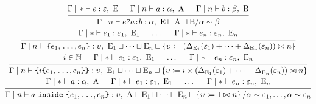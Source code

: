 \documentclass{article}
\newcommand{\A}{\mathrm{A}}
\newcommand{\B}{\mathrm{B}}
\newcommand{\E}{\mathrm{E}}
\renewcommand{\epsilon}{\varepsilon}
\begin{document}
\begin{spreadlines}{2em}
    \begin{gather*}
        \begin{prooftree}
            \hypo{\Gamma \mid \ast \vdash e: \epsilon,~\E}
            \hypo{\Gamma \mid n \vdash a: \alpha,~\A}
            \hypo{\Gamma \mid n \vdash b: \beta,~\B}
            \infer3{\Gamma \mid n \vdash e \texttt{?} a \texttt{:} b: \alpha,~\E \sqcup \A \sqcup \B / \alpha \sim \beta}
        \end{prooftree}
        \\
        \begin{prooftree}
            \hypo{\Gamma \mid \ast \vdash e_1: \epsilon_1,~\E_1}
            \hypo{\dots}
            \hypo{\Gamma \mid \ast \vdash e_n: \epsilon_n,~\E_n}
            \infer3{\Gamma \mid n \vdash \texttt{\{}e_1, \texttt{\dots}, e_n \texttt{\}} : \upsilon,~\E_1 \sqcup \cdots \sqcup \E_n\sqcup\left\{\upsilon \coloneq \left(\Delta_{\E_1}(\epsilon_1) + \cdots + \Delta_{\E_n}(\epsilon_n)\right)\bowtie n\right\}}
        \end{prooftree}
        \\
        \begin{prooftree}
            \hypo{i \in \mathbb{N}}
            \hypo{\Gamma \mid \ast \vdash e_1: \epsilon_1,~\E_1}
            \hypo{\dots}
            \hypo{\Gamma \mid \ast \vdash e_n: \epsilon_n,~\E_n}
            \infer4{\Gamma \mid n \vdash \texttt{\{}i\texttt{\{}e_1, \texttt{\dots}, e_n \texttt{\}}\texttt{\}} : \upsilon,~\E_1 \sqcup \cdots \sqcup \E_n \sqcup \left\{\upsilon \coloneq i\times\left(\Delta_{\E_1}(\epsilon_1) + \cdots + \Delta_{\E_n}(\epsilon_n)\right) \bowtie n\right\}}
        \end{prooftree}
        \\
        \begin{prooftree}
            \hypo{\Gamma \mid \ast \vdash a: \alpha,~\A}
            \hypo{\Gamma \mid \ast \vdash e_1: \epsilon_1,~\E_1}
            \hypo{\dots}
            \hypo{\Gamma \mid \ast \vdash e_n: \epsilon_n,~\E_n}
            \infer4{\Gamma \mid n \vdash a~\texttt{inside}~\texttt{\{}e_1, \texttt{\dots}, e_n \texttt{\}} : \upsilon,~\A \sqcup \E_1 \sqcup \cdots \sqcup \E_n \sqcup \left\{\upsilon \coloneq 1 \bowtie n\right\} / \alpha \sim \epsilon_1, \dots, \alpha \sim \epsilon_n}
        \end{prooftree}
    \end{gather*}
\end{spreadlines}
\end{document}
